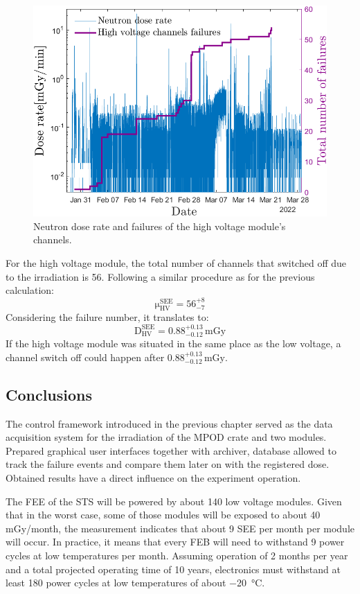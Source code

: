 \begin{figure}[!h]
    \centering
    \includegraphics[width=0.6\columnwidth]{Chapter4/images/Hv_neutrons_dose_rate.png}
    \caption{Neutron dose rate and failures of the high voltage module's channels.}
    \label{fig:hv_neutrons_rate}
\end{figure}
For the high voltage module, the total number of channels that switched off due to the irradiation is 56. Following a similar procedure as for the previous calculation:
  \begin{equation}
 \mathrm{\mu}_{\mathrm{HV}}^{\mathrm{SEE}}=\mathrm{56}_{-7}^{+8}
\end{equation}
Considering the failure number, it translates to:
\begin{equation}
    \mathrm{D}_{\mathrm{HV}}^{\mathrm{SEE}}=\mathrm{0.88}_{-0.12}^{+0.13}\mathrm{\,mGy}
\end{equation}
If the high voltage module was situated in the same place as the low voltage, a channel switch off could happen after $\mathrm{0.88}_{-0.12}^{+0.13}\mathrm{\,mGy}$.
\newpage
\subsection{Conclusions}

\label{irradiation_results}
The control framework introduced in the previous chapter served as the data acquisition system for the irradiation of the MPOD crate and two modules. Prepared graphical user interfaces together with archiver, database allowed to track the failure events and compare them later on with the registered dose. Obtained results have a direct influence on the experiment operation.

The \gls{FEE} of the \gls{STS} will be powered by about 140 low voltage modules. Given that in the worst case, some of those modules will be exposed to about 40\,mGy/month, the measurement indicates that about 9 \gls{SEE} per month per module will occur. In practice, it means that every \gls{FEB} will need to withstand 9 power cycles at low temperatures per month. Assuming operation of 2 months per year and a total projected operating time of 10 years, electronics must withstand at least 180 power cycles at low temperatures of about \SI{-20}{\celsius}.
